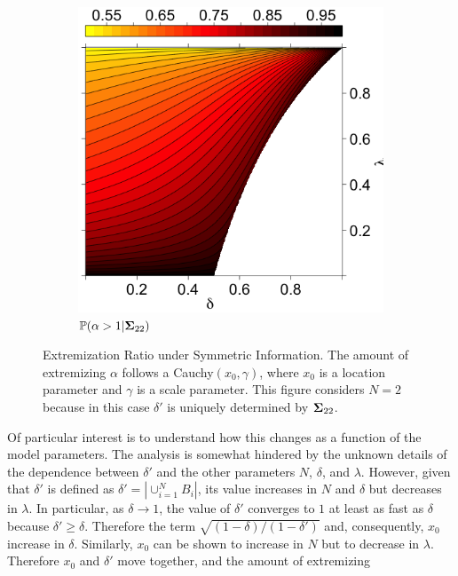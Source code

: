 \documentclass[12pt]{article}
\renewcommand{\P}{\mathbb{P}}
\theoremstyle{definition}
\theoremstyle{definition}
\def\P{{\mathbb P}}
\begin{document}
\begin{figure}[t]
\begin{subfigure}[b]{0.5\textwidth}
                \includegraphics[width=\textwidth, height = \textwidth]{Probs}
\caption{$\P(\alpha > 1 | {\bf\Sigma}_{22})$}
\label{probOracle}
        \end{subfigure}

        \caption{Extremization Ratio under Symmetric Information. The amount of extremizing $\alpha$ follows a Cauchy$(x_0, \gamma)$, where $x_0$ is a location parameter and $\gamma$ is a scale parameter. This figure considers  $N = 2$ because in this case $\delta'$ is uniquely determined by ${\bf\Sigma}_{22}$.}
        \label{LevelplotsOracle}
\end{figure}
Of particular interest is to understand how this changes as a function of the model parameters. The analysis is somewhat hindered by the unknown details of the dependence between $\delta'$ and the other parameters $N$, $\delta$, and $\lambda$. However, given that $\delta'$ is defined as $\delta' = |\cup_{i=1}^N B_i|$, its value  increases in $N$ and $\delta$ but decreases in $\lambda$. In particular, as $\delta \to 1$, the value of $\delta'$ converges to $1$ at least as fast as $\delta$ because  $\delta' \geq \delta$. Therefore the term $\sqrt{(1-\delta)/(1-\delta')}$ and, consequently, $x_0$ increase in $\delta$. Similarly, $x_0$ can be shown to increase in $N$ but to decrease in $\lambda$. Therefore $x_0$ and $\delta'$ move together, and the amount of extremizing
\end{document}
